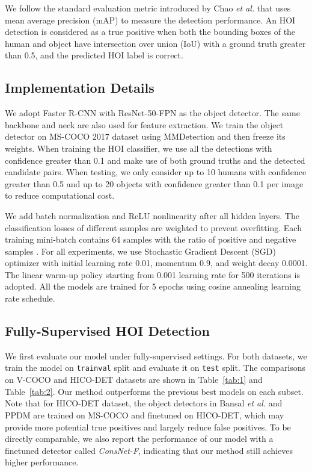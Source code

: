 \documentclass[sigconf,screen]{acmart}
\begin{document}
We follow the standard evaluation metric introduced by Chao \textit{et al.} \cite{chao2018learning} that uses mean average precision (mAP) to measure the detection performance. An HOI detection is considered as a true positive when both the bounding boxes of the human and object have intersection over union (IoU) with a ground truth greater than 0.5, and the predicted HOI label is correct.

\subsection{Implementation Details}

We adopt Faster R-CNN \cite{ren2015faster} with ResNet-50-FPN as the object detector. The same backbone and neck are also used for feature extraction. We train the object detector on MS-COCO 2017 dataset using MMDetection \cite{chen2019mmdetection} and then freeze its weights. When training the HOI classifier, we use all the detections with confidence greater than 0.1 and make use of both ground truths and the detected candidate pairs. When testing, we only consider up to 10 humans with confidence greater than 0.5 and up to 20 objects with confidence greater than 0.1 per image to reduce computational cost.

We add batch normalization \cite{ioffe2015batch} and ReLU nonlinearity \cite{glorot2011deep} after all hidden layers. The classification losses of different samples are weighted to prevent overfitting. Each training mini-batch contains 64 samples with the ratio of positive and negative samples . For all experiments, we use Stochastic Gradient Descent (SGD) optimizer with initial learning rate 0.01, momentum 0.9, and weight decay 0.0001. The linear warm-up policy starting from 0.001 learning rate for 500 iterations is adopted. All the models are trained for 5 epochs using cosine annealing learning rate schedule.

\subsection{Fully-Supervised HOI Detection}

We first evaluate our model under fully-supervised settings. For both datasets, we train the model on \verb|trainval| split and evaluate it on \verb|test| split. The comparisons on V-COCO and HICO-DET datasets are shown in Table~\ref{tab:1} and Table~\ref{tab:2}. Our method outperforms the previous best models on each subset. Note that for HICO-DET dataset, the object detectors in Bansal \textit{et al.} \cite{bansal2019detecting} and PPDM \cite{liao2020ppdm} are trained on MS-COCO and finetuned on HICO-DET, which may provide more potential true positives and largely reduce false positives. To be directly comparable, we also report the performance of our model with a finetuned detector called \textit{ConsNet-F}, indicating that our method still achieves higher performance.
\end{document}

